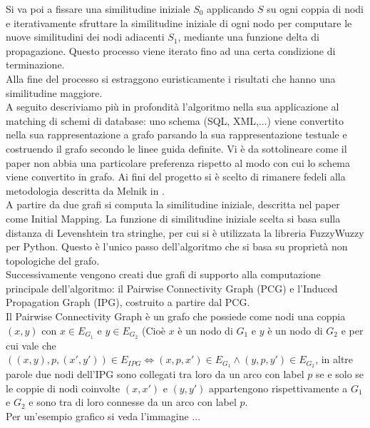 \documentclass{article}
\begin{document}
Si va poi a fissare una similitudine iniziale $S_0$ applicando $S$ su ogni coppia di nodi e iterativamente sfruttare la similitudine iniziale di ogni nodo per computare le nuove similitudini dei nodi adiacenti $S_1$, mediante una funzione delta di propagazione. Questo processo viene iterato fino ad una certa condizione di terminazione.\\

Alla fine del processo si estraggono euristicamente i risultati che hanno una similitudine maggiore.\\

A seguito descriviamo più in profondità l’algoritmo nella sua applicazione al matching di schemi di database: uno schema (SQL, XML,...) viene convertito nella sua rappresentazione a grafo parsando la sua rappresentazione testuale e costruendo il grafo secondo le linee guida definite. Vi è da sottolineare come il paper non abbia una particolare preferenza rispetto al modo con cui lo schema viene convertito in grafo. Ai fini del progetto si è scelto di rimanere fedeli alla metodologia descritta da Melnik in \citep{generic_model_man}.\\

A partire da due grafi si computa la similitudine iniziale, descritta nel paper come Initial Mapping. La funzione di similitudine iniziale scelta si basa sulla distanza di Levenshtein tra stringhe, per cui si è utilizzata la libreria FuzzyWuzzy per Python. Questo è l’unico passo dell’algoritmo che si basa su proprietà non topologiche del grafo.\\

Successivamente vengono creati due grafi di supporto alla computazione principale dell’algoritmo: il Pairwise Connectivity Graph (PCG) e l’Induced Propagation Graph (IPG), costruito a partire dal PCG.\\

Il Pairwise Connectivity Graph è un grafo che possiede come nodi una coppia $(x,y)$ con $x\in E_{G_1}$ e $y\in E_{G_2}$ (Cioè $x$ è un nodo di $G_1$ e $y$ è un nodo di $G_2$ e per cui vale che $((x,y), p, (x', y')) \in E_{IPG} \Leftrightarrow (x, p, x') \in E_{G_1} \wedge (y, p, y') \in E_{G_2}$, in altre parole due nodi dell'IPG sono collegati tra loro da un arco con label $p$ se e solo se le coppie di nodi coinvolte $(x, x')$ e $(y, y')$ appartengono rispettivamente a $G_1$ e $G_2$ e sono tra di loro connesse da un arco con label $p$.\\

Per un'esempio grafico si veda l'immagine ...
\end{document}
